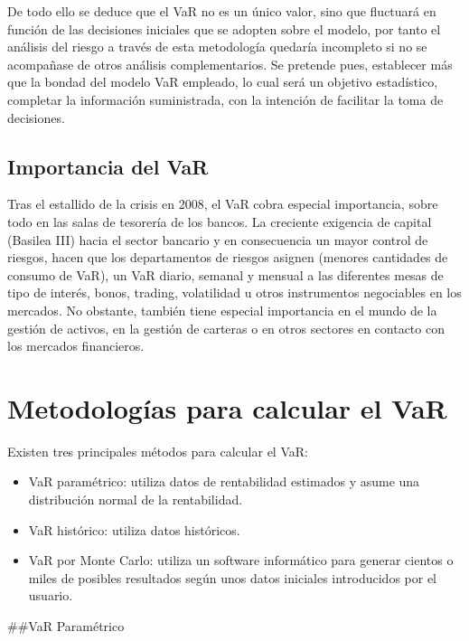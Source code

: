 \documentclass[
  12pt,
]{krantz}
\providecommand{\tightlist}{%
  \setlength{\itemsep}{0pt}\setlength{\parskip}{0pt}}
\begin{document}
De todo ello se deduce que el VaR no es un único valor, sino que fluctuará en función de las decisiones iniciales que se adopten sobre el modelo, por tanto el análisis del riesgo a través de esta metodología quedaría incompleto si no se acompañase de otros análisis complementarios. Se pretende pues, establecer más que la bondad del modelo VaR empleado, lo cual será un objetivo estadístico, completar la información suministrada, con la intención de facilitar la toma de decisiones.

\hypertarget{importancia-del-var}{%
\subsection{Importancia del VaR}\label{importancia-del-var}}

Tras el estallido de la crisis en 2008, el VaR cobra especial importancia, sobre todo en las salas de tesorería de los bancos. La creciente exigencia de capital (Basilea III) hacia el sector bancario y en consecuencia un mayor control de riesgos, hacen que los departamentos de riesgos asignen (menores cantidades de consumo de VaR), un VaR diario, semanal y mensual a las diferentes mesas de tipo de interés, bonos, trading, volatilidad u otros instrumentos negociables en los mercados. No obstante, también tiene especial importancia en el mundo de la gestión de activos, en la gestión de carteras o en otros sectores en contacto con los mercados financieros.

\hypertarget{metodologias-para-calcular-el-var}{%
\section{Metodologías para calcular el VaR}\label{metodologias-para-calcular-el-var}}

Existen tres principales métodos para calcular el VaR:

\begin{itemize}
\tightlist
\item
  VaR paramétrico: utiliza datos de rentabilidad estimados y asume una distribución normal de la rentabilidad.
\item
  VaR histórico: utiliza datos históricos.
\item
  VaR por Monte Carlo: utiliza un software informático para generar cientos o miles de posibles resultados según unos datos iniciales introducidos por el usuario.
\end{itemize}

\#\#VaR Paramétrico
\end{document}
